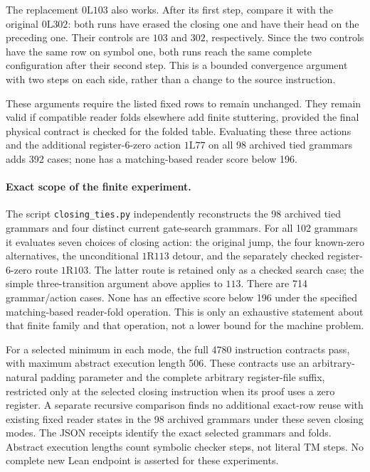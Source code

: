 The replacement $0\mathrm L103$ also works.  After its first step,
compare it with the original $0\mathrm L302$: both runs have erased the
closing one and have their head on the preceding one.  Their controls
are $103$ and $302$, respectively.  Since the two controls have the same
row on symbol one, both runs reach the same complete configuration after
their second step.  This is a bounded convergence argument with two
steps on each side, rather than a change to the source instruction.

These arguments require the listed fixed rows to remain unchanged.
They remain valid if compatible reader folds elsewhere add finite
stuttering, provided the final physical contract is checked for the
folded table.  Evaluating these three actions and the additional
register-6-zero action $1\mathrm L77$ on all 98 archived tied grammars
adds 392 cases; none has a matching-based reader score below 196.

\paragraph{Exact scope of the finite experiment.}
The script \texttt{closing\_ties.py} independently reconstructs the 98
archived tied grammars and four distinct current gate-search grammars.
For all 102 grammars it evaluates seven choices of closing action: the
original jump, the four known-zero alternatives, the unconditional
$1\mathrm R113$ detour, and the separately checked register-6-zero route
$1\mathrm R103$.  The latter route is retained only as a checked search
case; the simple three-transition argument above applies to $113$.
There are 714 grammar/action cases.  None has an effective score below
196 under the specified matching-based reader-fold operation.  This is
only an exhaustive statement about that finite family and that operation,
not a lower bound for the machine problem.

For a selected minimum in each mode, the full 4780 instruction contracts
pass, with maximum abstract execution length 506.  These contracts use
an arbitrary-natural padding parameter and the complete arbitrary
register-file suffix, restricted only at the selected closing instruction
when its proof uses a zero register.  A separate recursive comparison
finds no additional exact-row reuse with existing fixed reader states in
the 98 archived grammars under these seven closing modes.  The JSON
receipts identify the exact selected grammars and folds.  Abstract
execution lengths count symbolic checker steps, not literal TM steps.
No complete new Lean endpoint is asserted for these experiments.
